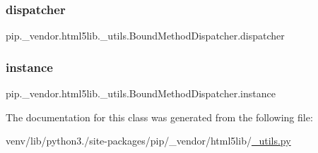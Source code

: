 \subsubsection{\texorpdfstring{dispatcher}{dispatcher}}
{\footnotesize\ttfamily pip.\+\_\+vendor.\+html5lib.\+\_\+utils.\+Bound\+Method\+Dispatcher.\+dispatcher}

\mbox{\label{classpip_1_1__vendor_1_1html5lib_1_1__utils_1_1BoundMethodDispatcher_ae216cf959a5f37380056d0d00103ac53}} 
\subsubsection{\texorpdfstring{instance}{instance}}
{\footnotesize\ttfamily pip.\+\_\+vendor.\+html5lib.\+\_\+utils.\+Bound\+Method\+Dispatcher.\+instance}



The documentation for this class was generated from the following file\+:\begin{DoxyCompactItemize}
\item 
venv/lib/python3./site-\/packages/pip/\+\_\+vendor/html5lib/\hyperlink{html5lib_2__utils_8py}{\+\_\+utils.\+py}\end{DoxyCompactItemize}
